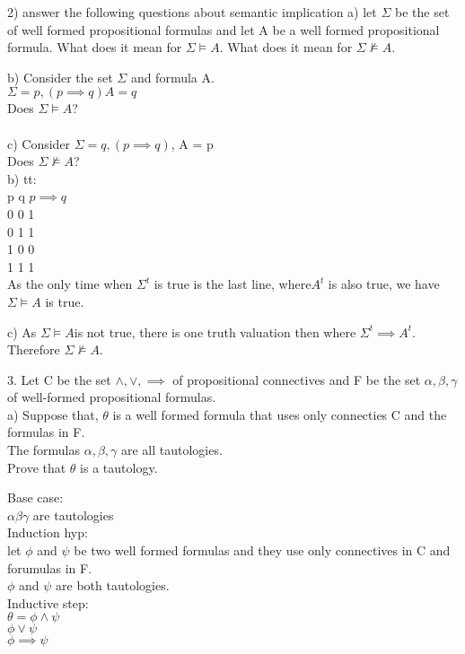 \documentclass[12pt,oneside,notitlepage]{book}
\theoremstyle{definition}
\begin{document}
2) answer the following questions about semantic implication
a) let $\Sigma$ be the set of well formed propositional formulas and let A be a well formed propositional formula. What does it mean for $\Sigma \vDash A$. What does it mean for $\Sigma \not \vDash A$.

b) Consider the set $\Sigma$ and formula A. \\
$\Sigma = { p, (p \implies q)} A = q$ \\
Does $\Sigma \models A$? \\ \\
c) Consider $\Sigma = { q, (p \implies q)} $, A = p \\
Does $\Sigma \not \models A$? \\

b) tt: \\
p q $p \implies q$ \\
0 0 1 \\
0 1 1 \\ 
1 0 0 \\ 
1 1 1 \\
As the only time when $\Sigma^t$ is true is the last line, where$ A^t$ is also true, we have $\Sigma \models A$ is true.

c)
As $\Sigma \models A $is not true, there is one truth valuation then where $\Sigma^t \implies A^t$. Therefore $\Sigma \not \models A$.

3.
Let C be the set ${ \land, \lor, \implies }$ of propositional connectives and F be the set ${ \alpha, \beta, \gamma }$ of well-formed propositional formulas. \\
a) Suppose that, $\theta$ is a well formed formula that uses only connecties C and the formulas in F. \\
The formulas $\alpha, \beta, \gamma$ are all tautologies. \\
Prove that $\theta$ is a tautology.

Base case: \\
$\alpha \beta \gamma$ are tautologies \\
Induction hyp: \\
let $\phi$ and $\psi$ be two well formed formulas and they use only connectives in C and forumulas in F. \\
$\phi$ and $\psi$ are both tautologies. \\
Inductive step: \\
$\theta = \phi \land \psi$ \\
$\phi \lor \psi$ \\
$\phi \implies \psi$ \\
\end{document}
